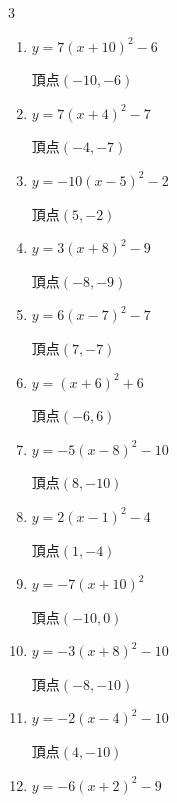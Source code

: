 \begin{multicols}{3}
\begin{enumerate}
        $\displaystyle 頂点\left( 3 , 8 \right)$

  \item $\displaystyle y=7\left( x+10\right)^{2}-6$

        $\displaystyle 頂点\left( -10 , -6 \right)$

  \item $\displaystyle y=7\left( x+4\right)^{2}-7$

        $\displaystyle 頂点\left( -4 , -7 \right)$

  \item $\displaystyle y=-10\left( x-5\right)^{2}-2$

        $\displaystyle 頂点\left( 5 , -2 \right)$

  \item $\displaystyle y=3\left( x+8\right)^{2}-9$

        $\displaystyle 頂点\left( -8 , -9 \right)$

  \item $\displaystyle y=6\left( x-7\right)^{2}-7$

        $\displaystyle 頂点\left( 7 , -7 \right)$

  \item $\displaystyle y=\left( x+6\right)^{2}+6$

        $\displaystyle 頂点\left( -6 , 6 \right)$

  \item $\displaystyle y=-5\left( x-8\right)^{2}-10$

        $\displaystyle 頂点\left( 8 , -10 \right)$

  \item $\displaystyle y=2\left( x-1\right)^{2}-4$

        $\displaystyle 頂点\left( 1 , -4 \right)$

  \item $\displaystyle y=-7\left( x+10\right)^{2}$

        $\displaystyle 頂点\left( -10 , 0 \right)$

  \item $\displaystyle y=-3\left( x+8\right)^{2}-10$

        $\displaystyle 頂点\left( -8 , -10 \right)$

  \item $\displaystyle y=-2\left( x-4\right)^{2}-10$

        $\displaystyle 頂点\left( 4 , -10 \right)$

  \item $\displaystyle y=-6\left( x+2\right)^{2}-9$


\end{enumerate}
\end{multicols}
